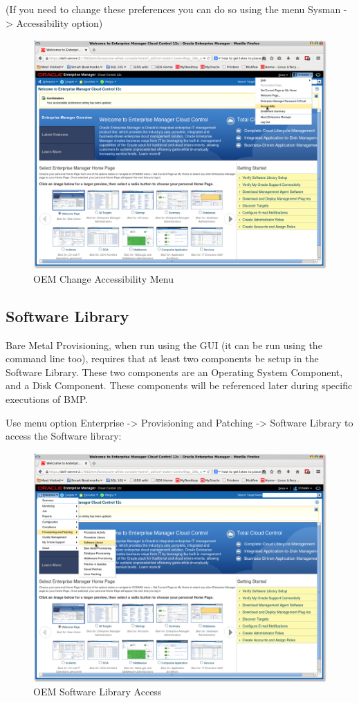 \documentclass[11pt]{article}
\begin{document}
\clearpage
(If you need to change these preferences you can do so using the menu Sysman -> Accessibility option)
\begin{figure}[htb]
\centering
\includegraphics[width=.9\linewidth]{images/OEM_Change_Accessibility.png}
\caption{OEM Change Accessibility Menu}
\end{figure}
\clearpage
\subsection{Software Library}
\label{sec-4-3}
Bare Metal Provisioning, when run using the GUI (it can be run using the command line too), requires that at least two components be setup in the Software Library. These two components are an Operating System Component, and a Disk Component. These components will be referenced later during specific executions of BMP.

Use menu option Enterprise -> Provisioning and Patching -> Software Library to access the Software library:
\begin{figure}[htb]
\centering
\includegraphics[width=.9\linewidth]{images/OEM_Software_Library_Access.png}
\caption{OEM Software Library Access}
\end{figure}
\end{document}
